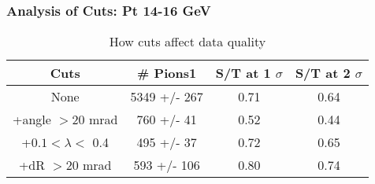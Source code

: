 \frame
{
\frametitle{Analysis of Cuts: Pt 14-16 GeV}
\begin{table}
\caption{How cuts affect data quality}
\centering
\begin{tabular}{c c c c}
\hline\hline
Cuts & \# Pions1 & S/T at 1 $\sigma$ & S/T at 2 $\sigma$ \\ [0.5ex]
\hline
None & 5349 +/-  267 & 0.71 & 0.64 \\ %
+angle $> 20$ mrad &  760 +/-   41 & 0.52 & 0.44 \\ %
+$0.1 < \lambda <$ 0.4 &  495 +/-   37 & 0.72 & 0.65 \\ %
+dR $> 20$ mrad &  593 +/-  106 & 0.80 & 0.74 \\ %
[1ex]
\hline
\end{tabular}
\label{table:nonlin}
\end{table}
}
